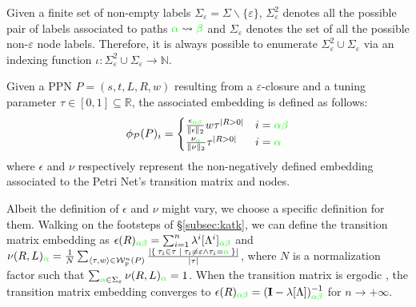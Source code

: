 \begin{definition}\label{def:ppne}
Given a finite set of non-empty labels $\Sigma_\varepsilon =\Sigma\backslash\{\varepsilon\}$, $\Sigma_\varepsilon^2$ denotes all the possible pair of labels associated to paths ${\color{green}\alpha}\rightsquigarrow{\color{green}\beta}$ and $\Sigma_\varepsilon$ denotes the set of all the possible non-$\varepsilon$ node labels. Therefore, it is always possible to enumerate $\Sigma_\varepsilon^2\cup\Sigma_\varepsilon$ via an indexing function $\iota\colon \Sigma_\varepsilon^2\cup\Sigma_\varepsilon\to  \mathbb{N}$.
	
Given a PPN $P=(s,t,L,R,w)$ resulting from a $\varepsilon$-closure and a tuning parameter $\tau\in[0,1]\subseteq\mathbb{R}$, the associated embedding is defined as follows:
$$\phi_{\mathcal{P}}(P)_i=\begin{cases}
	\frac{\epsilon_{\color{green}\alpha\beta}}{\|\epsilon\|_2}w\tau^{|R>0|} & i={\color{green}\alpha\beta}\\
	\frac{\nu_{\color{green}\alpha}}{\|\nu\|_2}\tau^{|R>0|} & i={\color{green}\alpha}\\
\end{cases}$$
where $\epsilon$ and $\nu$ respectively represent the non-negatively defined embedding associated to the Petri Net's transition matrix and nodes. 
\end{definition}

Albeit the definition of $\epsilon$ and $\nu$ might vary, we choose a specific definition for them. 
Walking on the footsteps of \S\ref{subsec:katk}, we can define the transition matrix embedding as  $\epsilon(R)_{\color{green}\alpha\beta}=\sum_{i=1}^n\lambda^i[\Lambda^i]_{\color{green}\alpha\beta}$ and $\nu(R,L)_{\color{green}\alpha}=\frac{1}{N}\sum_{\braket{\tau,w}\in\mathcal{W}_p^n(P)}\frac{|\Set{\tau_i\in\tau|\tau_i\neq\varepsilon\wedge \tau_i={\color{green}\alpha}}|}{|\tau|}$, where $N$ is a normalization factor such that $\sum_{{\color{green}\alpha}\in\Sigma_\varepsilon}\nu(R,L)_{\color{green}\alpha}=1$. When the transition matrix is ergodic \cite{StocasticCC},  the transition matrix embedding converges to $\epsilon(R)_{\color{green}\alpha\beta}=(\mathbf{I}-\lambda[\Lambda])^{-1}_{\color{green}\alpha\beta}$ \cite{GartnerFW03} for $n\to+\infty$.

